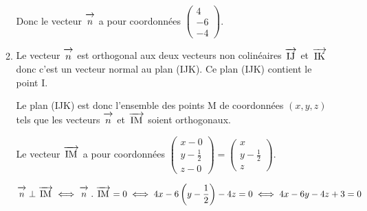 \documentclass[10pt]{article}
\newcommand{\vect}[1]{\overrightarrow{\,\mathstrut#1\,}}
\begin{document}
\begin{enumerate}
\begin{enumerate}

Donc le vecteur $\vect{n}$ a pour coordonnées
$\begin{pmatrix} 4 \\ -6 \\ -4 \end{pmatrix}$.
		
		\item%
Le vecteur $\vect{n}$ est orthogonal aux deux vecteurs non colinéaires	$\vect{\text{IJ}}$ et  $\vect{\text{IK}}$	donc c'est un vecteur normal au plan (IJK). Ce plan (IJK) contient le point I.

Le plan (IJK) est donc l'ensemble des points M de coordonnées $(x,y,z)$ tels que les vecteurs  $\vect{n}$ et $ \vect{\text{IM}}$ soient orthogonaux.

Le vecteur $\vect{\text{IM}}$ a pour coordonnées
$\begin{pmatrix} x-0 \\ y-\frac{1}{2} \\ z-0\end{pmatrix}
=\begin{pmatrix} x\\ y-\frac{1}{2} \\ z\end{pmatrix}$.

$\vect{n} \perp  \vect{\text{IM}} \iff \vect{n}\;.\;\vect{\text{IM}}=0
\iff 4x -6\left (y-\dfrac{1}{2}\right ) -4z=0
\iff 4x -6y -4z +3=0$


\end{enumerate}
\end{enumerate}
\end{document}
